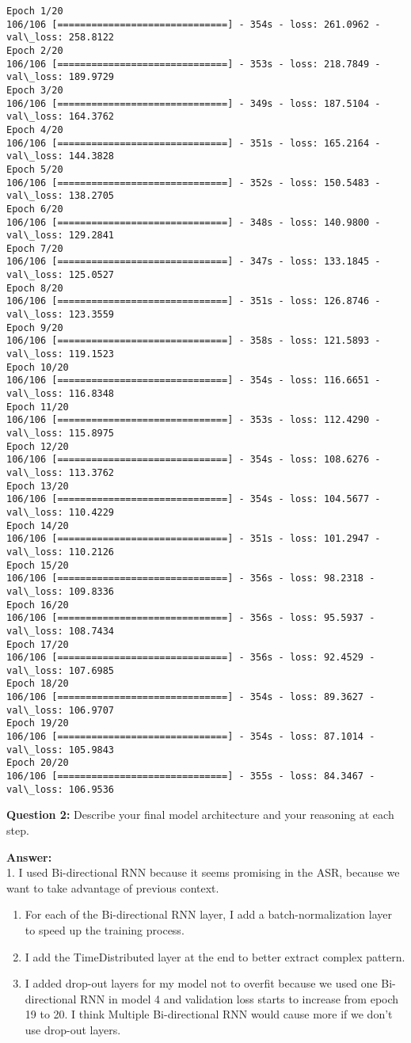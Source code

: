 \documentclass[11pt]{article}
\begin{document}
    \begin{Verbatim}[commandchars=\\\{\}]
Epoch 1/20
106/106 [==============================] - 354s - loss: 261.0962 - val\_loss: 258.8122
Epoch 2/20
106/106 [==============================] - 353s - loss: 218.7849 - val\_loss: 189.9729
Epoch 3/20
106/106 [==============================] - 349s - loss: 187.5104 - val\_loss: 164.3762
Epoch 4/20
106/106 [==============================] - 351s - loss: 165.2164 - val\_loss: 144.3828
Epoch 5/20
106/106 [==============================] - 352s - loss: 150.5483 - val\_loss: 138.2705
Epoch 6/20
106/106 [==============================] - 348s - loss: 140.9800 - val\_loss: 129.2841
Epoch 7/20
106/106 [==============================] - 347s - loss: 133.1845 - val\_loss: 125.0527
Epoch 8/20
106/106 [==============================] - 351s - loss: 126.8746 - val\_loss: 123.3559
Epoch 9/20
106/106 [==============================] - 358s - loss: 121.5893 - val\_loss: 119.1523
Epoch 10/20
106/106 [==============================] - 354s - loss: 116.6651 - val\_loss: 116.8348
Epoch 11/20
106/106 [==============================] - 353s - loss: 112.4290 - val\_loss: 115.8975
Epoch 12/20
106/106 [==============================] - 354s - loss: 108.6276 - val\_loss: 113.3762
Epoch 13/20
106/106 [==============================] - 354s - loss: 104.5677 - val\_loss: 110.4229
Epoch 14/20
106/106 [==============================] - 351s - loss: 101.2947 - val\_loss: 110.2126
Epoch 15/20
106/106 [==============================] - 356s - loss: 98.2318 - val\_loss: 109.8336
Epoch 16/20
106/106 [==============================] - 356s - loss: 95.5937 - val\_loss: 108.7434
Epoch 17/20
106/106 [==============================] - 356s - loss: 92.4529 - val\_loss: 107.6985
Epoch 18/20
106/106 [==============================] - 354s - loss: 89.3627 - val\_loss: 106.9707
Epoch 19/20
106/106 [==============================] - 354s - loss: 87.1014 - val\_loss: 105.9843
Epoch 20/20
106/106 [==============================] - 355s - loss: 84.3467 - val\_loss: 106.9536

    \end{Verbatim}

    \textbf{Question 2:} Describe your final model architecture and your
reasoning at each step.

\textbf{Answer:}\\
1. I used Bi-directional RNN because it seems promising in the ASR,
because we want to take advantage of previous context.

\begin{enumerate}
\def\labelenumi{\arabic{enumi}.}
\setcounter{enumi}{1}
\item
  For each of the Bi-directional RNN layer, I add a batch-normalization
  layer to speed up the training process.
\item
  I add the TimeDistributed layer at the end to better extract complex
  pattern.
\item
  I added drop-out layers for my model not to overfit because we used
  one Bi-directional RNN in model 4 and validation loss starts to
  increase from epoch 19 to 20. I think Multiple Bi-directional RNN
  would cause more if we don't use drop-out layers.
\end{enumerate}
\end{document}
